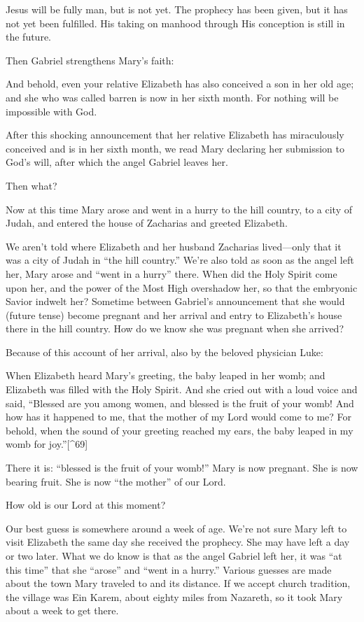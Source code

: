 \documentclass[
]{book}
\begin{document}
Jesus will be fully man, but is not yet. The prophecy has been given, but it has not yet been fulfilled. His taking on manhood through His conception is still in the future.

Then Gabriel strengthens Mary's faith:

And behold, even your relative Elizabeth has also conceived a son in her old age; and she who was called barren is now in her sixth month. For nothing will be impossible with God.

After this shocking announcement that her relative Elizabeth has miraculously conceived and is in her sixth month, we read Mary declaring her submission to God's will, after which the angel Gabriel leaves her.

Then what?

Now at this time Mary arose and went in a hurry to the hill country, to a city of Judah, and entered the house of Zacharias and greeted Elizabeth.

We aren't told where Elizabeth and her husband Zacharias lived---only that it was a city of Judah in ``the hill country.'' We're also told as soon as the angel left her, Mary arose and ``went in a hurry'' there. When did the Holy Spirit come upon her, and the power of the Most High overshadow her, so that the embryonic Savior indwelt her? Sometime between Gabriel's announcement that she would (future tense) become pregnant and her arrival and entry to Elizabeth's house there in the hill country. How do we know she was pregnant when she arrived?

Because of this account of her arrival, also by the beloved physician Luke:

When Elizabeth heard Mary's greeting, the baby leaped in her womb; and Elizabeth was filled with the Holy Spirit. And she cried out with a loud voice and said, ``Blessed are you among women, and blessed is the fruit of your womb! And how has it happened to me, that the mother of my Lord would come to me? For behold, when the sound of your greeting reached my ears, the baby leaped in my womb for joy.''{[}\^{}69{]}

There it is: ``blessed is the fruit of your womb!'' Mary is now pregnant. She is now bearing fruit. She is now ``the mother'' of our Lord.

How old is our Lord at this moment?

Our best guess is somewhere around a week of age. We're not sure Mary left to visit Elizabeth the same day she received the prophecy. She may have left a day or two later. What we do know is that as the angel Gabriel left her, it was ``at this time'' that she ``arose'' and ``went in a hurry.'' Various guesses are made about the town Mary traveled to and its distance. If we accept church tradition, the village was Ein Karem, about eighty miles from Nazareth, so it took Mary about a week to get there.
\end{document}
